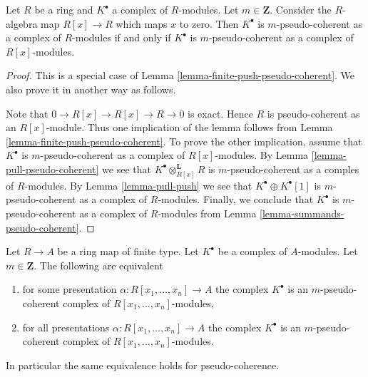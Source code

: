 \begin{lemma}
\label{lemma-add-variable-pseudo-coherent}
Let $R$ be a ring and $K^\bullet$ a complex of $R$-modules.
Let $m \in \mathbf{Z}$. Consider the $R$-algebra map $R[x] \to R$
which maps $x$ to zero. Then $K^\bullet$ is $m$-pseudo-coherent as
a complex of $R$-modules if and only if $K^\bullet$ is $m$-pseudo-coherent
as a complex of $R[x]$-modules.
\end{lemma}

\begin{proof}
This is a special case of
Lemma \ref{lemma-finite-push-pseudo-coherent}.
We also prove it in another way as follows.

\medskip\noindent
Note that $0 \to R[x] \to R[x] \to R \to 0$ is exact. Hence $R$ is
pseudo-coherent as an $R[x]$-module. Thus one implication of the lemma
follows from
Lemma \ref{lemma-finite-push-pseudo-coherent}.
To prove the other implication, assume that $K^\bullet$ is
$m$-pseudo-coherent as a complex of $R[x]$-modules. By
Lemma \ref{lemma-pull-pseudo-coherent}
we see that $K^\bullet \otimes^{\mathbf{L}}_{R[x]} R$ is
$m$-pseudo-coherent as a comples of $R$-modules. By
Lemma \ref{lemma-pull-push}
we see that $K^\bullet \oplus K^\bullet[1]$ is $m$-pseudo-coherent
as a complex of $R$-modules.
Finally, we conclude that $K^\bullet$ is $m$-pseudo-coherent
as a complex of $R$-modules from
Lemma \ref{lemma-summands-pseudo-coherent}.
\end{proof}

\begin{lemma}
\label{lemma-relatively-pseudo-coherent}
Let $R \to A$ be a ring map of finite type.
Let $K^\bullet$ be a complex of $A$-modules.
Let $m \in \mathbf{Z}$.
The following are equivalent
\begin{enumerate}
\item for some presentation $\alpha : R[x_1, \ldots, x_n] \to A$
the complex $K^\bullet$ is an $m$-pseudo-coherent complex of
$R[x_1, \ldots, x_n]$-modules,
\item for all presentations $\alpha : R[x_1, \ldots, x_n] \to A$
the complex $K^\bullet$ is an $m$-pseudo-coherent complex of
$R[x_1, \ldots, x_n]$-modules.
\end{enumerate}
In particular the same equivalence holds for pseudo-coherence.
\end{lemma}

